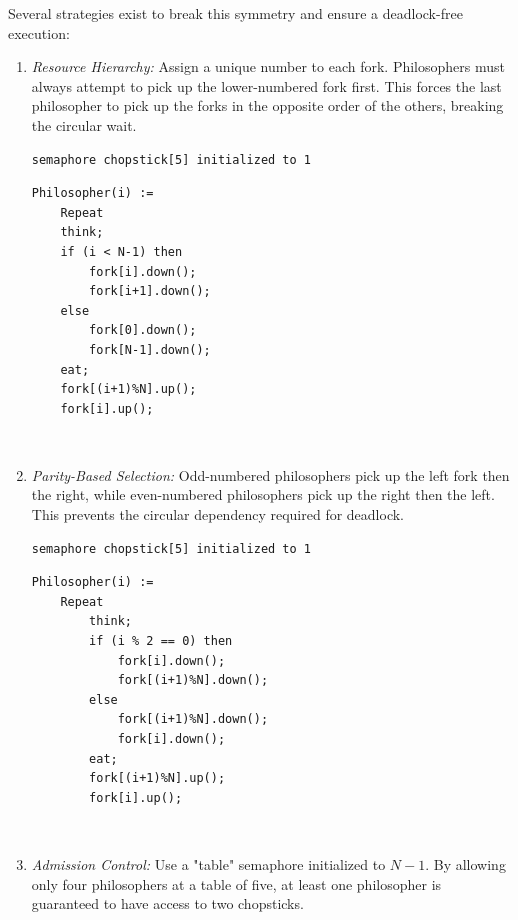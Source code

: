 Several strategies exist to break this symmetry and ensure a deadlock-free execution:
\begin{enumerate}
    \item \textit{Resource Hierarchy:} Assign a unique number to each fork. Philosophers must always attempt to pick up the lower-numbered fork first. This forces the last philosopher to pick up the forks in the opposite order of the others, breaking the circular wait.

\begin{minipage}{\textwidth}
\begin{lstlisting}[mathescape]
semaphore chopstick[5] initialized to 1
\end{lstlisting}
\begin{lstlisting}[mathescape]
Philosopher(i) :=
    Repeat
    think;
    if (i < N-1) then
        fork[i].down();
        fork[i+1].down();
    else
        fork[0].down();
        fork[N-1].down();
    eat;
    fork[(i+1)%N].up();
    fork[i].up();
\end{lstlisting}
\end{minipage}\\

    \item \textit{Parity-Based Selection:} Odd-numbered philosophers pick up the left fork then the right, while even-numbered philosophers pick up the right then the left. This prevents the circular dependency required for deadlock.

\begin{minipage}{\textwidth}
\begin{lstlisting}[mathescape]
semaphore chopstick[5] initialized to 1
\end{lstlisting}
\begin{lstlisting}[mathescape]
Philosopher(i) :=
    Repeat
        think;
        if (i % 2 == 0) then
            fork[i].down();
            fork[(i+1)%N].down();
        else
            fork[(i+1)%N].down();
            fork[i].down();
        eat;
        fork[(i+1)%N].up();
        fork[i].up();
\end{lstlisting}
\end{minipage}\\

    \item \textit{Admission Control:} Use a "table" semaphore initialized to $N-1$. By allowing only four philosophers at a table of five, at least one philosopher is guaranteed to have access to two chopsticks.


\end{enumerate}
